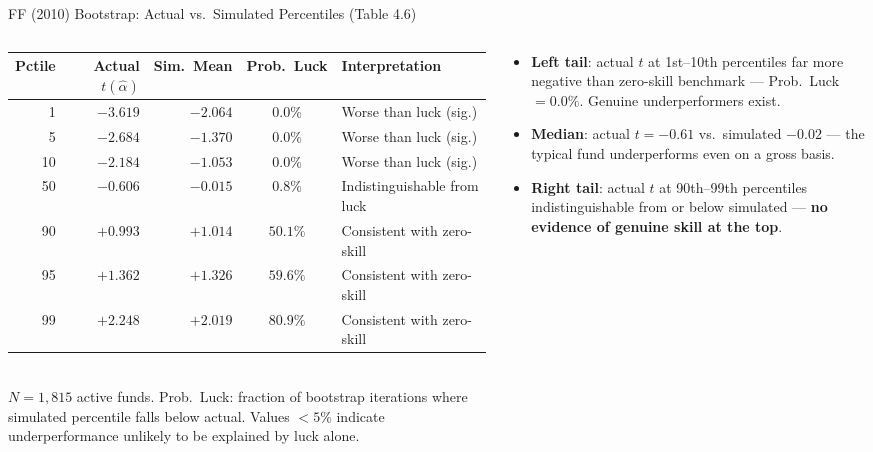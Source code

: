 \documentclass[10pt, aspectratio=169]{beamer}
\begin{document}
\begin{frame}{FF (2010) Bootstrap: Actual vs.\ Simulated Percentiles (Table 4.6)}
  \begin{columns}[T]
    \begin{column}{0.55\textwidth}
      \scriptsize
      \begin{tabular}{rrrcp{2.8cm}}
        \toprule
        Pctile & Actual $t(\hat{\alpha})$ & Sim.\ Mean & Prob.\ Luck & Interpretation \\
        \midrule
        1  & $-3.619$ & $-2.064$ & $0.0\%$ & Worse than luck (sig.) \\
        5  & $-2.684$ & $-1.370$ & $0.0\%$ & Worse than luck (sig.) \\
        10 & $-2.184$ & $-1.053$ & $0.0\%$ & Worse than luck (sig.) \\
        50 & $-0.606$ & $-0.015$ & $0.8\%$ & Indistinguishable from luck \\
        90 & $+0.993$ & $+1.014$ & $50.1\%$ & Consistent with zero-skill \\
        95 & $+1.362$ & $+1.326$ & $59.6\%$ & Consistent with zero-skill \\
        99 & $+2.248$ & $+2.019$ & $80.9\%$ & Consistent with zero-skill \\
        \bottomrule
      \end{tabular}
      \vspace{2pt}\\
      \tiny $N=1{,}815$ active funds. Prob.\ Luck: fraction of bootstrap iterations
      where simulated percentile falls below actual. Values $<5\%$ indicate
      underperformance unlikely to be explained by luck alone.
    \end{column}
    \begin{column}{0.42\textwidth}
      \footnotesize
      \begin{itemize}\itemsep3pt
        \item \textbf{Left tail}: actual $t$ at 1st–10th percentiles far more
              negative than zero-skill benchmark — Prob.\ Luck $= 0.0\%$.
              \alert{Genuine underperformers exist.}
        \item \textbf{Median}: actual $t = -0.61$ vs.\ simulated $-0.02$ —
              the typical fund underperforms even on a gross basis.
        \item \textbf{Right tail}: actual $t$ at 90th–99th percentiles
              indistinguishable from or below simulated —
              \textbf{no evidence of genuine skill at the top}.
      \end{itemize}
    \end{column}
  \end{columns}
\end{frame}
\end{document}
